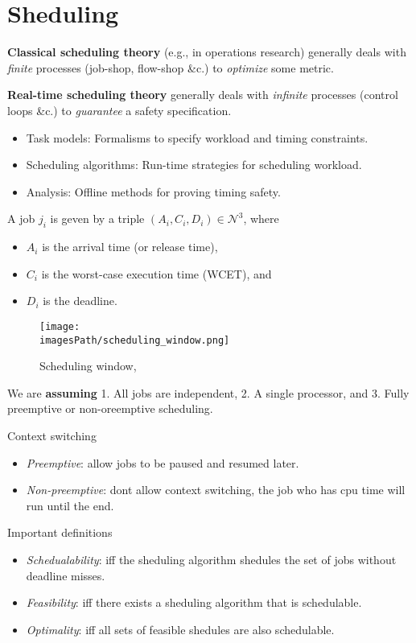 \section{Sheduling}
\textbf{Classical scheduling theory} (e.g., in operations research)
generally deals with \textit{finite} processes (job-shop, flow-shop \&c.)
to \textit{optimize} some metric.

\textbf{Real-time scheduling theory}
generally deals with \textit{infinite} processes (control loops \&c.)
to \textit{guarantee} a safety specification.

\begin{itemize}
  \item Task models: Formalisms to specify workload and timing constraints.
  \item Scheduling algorithms: Run-time strategies for scheduling workload.
  \item Analysis: Offline methods for proving timing safety.
\end{itemize}

A job $j_i$ is geven by a triple $(A_i,C_i,D_i)\in\mathcal{N}^3$, where
\begin{itemize}
  \item $A_i$ is the arrival time (or release time),
  \item $C_i$ is the  worst-case execution time (WCET), and 
  \item $D_i$ is the deadline.
\end{itemize}


\begin{figure}[H]
    \centering
    \texttt{[image: \\imagesPath/scheduling\_window.png]}
    \caption{Scheduling window, \cite{05, p.7}}
\end{figure}

We are \textbf{assuming} 1. All jobs are independent, 2. A single processor, and 3. Fully preemptive or non-oreemptive scheduling.

Context switching
\begin{itemize}
  \item \textit{Preemptive}: allow jobs to be paused and resumed later.
  \item \textit{Non-preemptive}: dont allow context switching, the job who has cpu time will run until the end.
\end{itemize}

Important definitions
\begin{itemize}
  \item \textit{Schedualability}: iff the sheduling algorithm shedules the set of jobs without deadline misses.
  \item \textit{Feasibility}: iff there exists a sheduling algorithm that is schedulable.
  \item \textit{Optimality}: iff all sets of feasible shedules are also schedulable.
\end{itemize}


